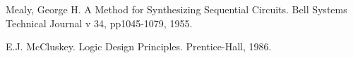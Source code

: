 \documentclass[journal]{IEEEtran}
\begin{document}
\begin{thebibliography}{1}
%
%
%
%
%
%
%
%
%
%
%
%
%

Mealy, George H.
A Method for Synthesizing Sequential Circuits.
Bell Systems Technical Journal v 34, pp1045-1079, 1955.

E.J. McCluskey.
Logic Design Principles.
Prentice-Hall,
1986.


\end{thebibliography}
\end{document}
